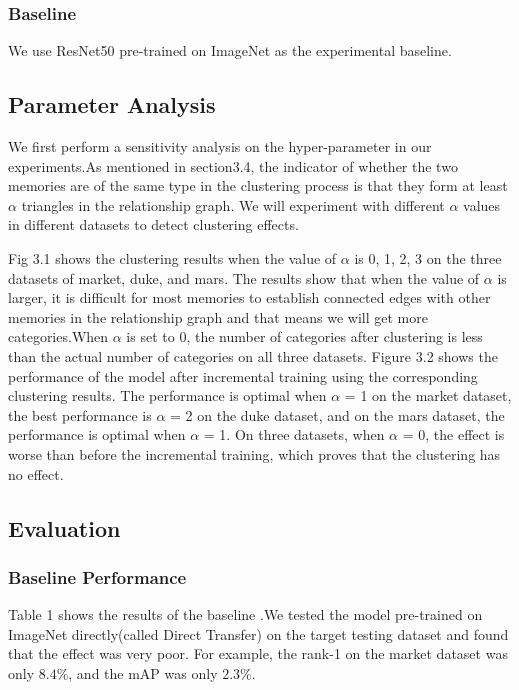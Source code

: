 \documentclass{article}
\begin{document}
\subsubsection{Baseline}
We use ResNet50 pre-trained on ImageNet as the experimental baseline.

\subsection{Parameter Analysis}
We first perform a sensitivity analysis on the hyper-parameter in our experiments.As mentioned in section3.4, the indicator of whether the two memories are of the same type in the clustering process is that they form at least $\alpha$ triangles in the relationship graph. We will experiment with different $\alpha$ values in different datasets to detect clustering effects.

Fig 3.1 shows the clustering results when the value of $\alpha$ is 0, 1, 2, 3 on the three datasets of market, duke, and mars. The results show that when the value of $\alpha$ is larger, it is difficult for most memories to establish connected edges with other memories in the relationship graph and that means we will get more categories.When $\alpha$ is set to 0, the number of categories after clustering is less than the actual number of categories on all three datasets. Figure 3.2 shows the performance of the model after incremental training using the corresponding clustering results. The performance is optimal when $\alpha$ = 1 on the market dataset, the best performance is $\alpha$ = 2 on the duke dataset, and on the mars dataset, the performance is optimal when $\alpha$ = 1. On three datasets, when $\alpha$ = 0, the effect is worse than before the incremental training, which proves that the clustering has no effect.


\subsection{Evaluation}

\subsubsection{Baseline Performance}
Table 1 shows the results of the baseline .We tested the model pre-trained on ImageNet directly(called Direct Transfer) on the target testing dataset and found that the effect was very poor. For example, the rank-1 on the market dataset was only $8.4\%$, and the mAP was only $2.3\%$. 
\end{document}

